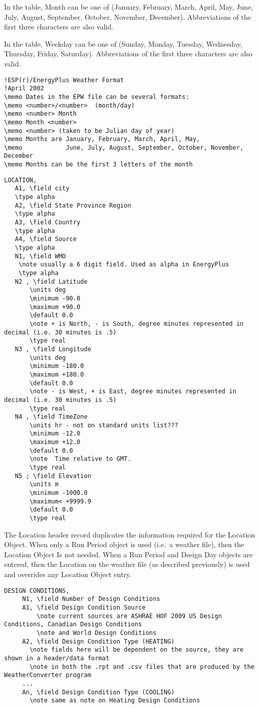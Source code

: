 In the table, Month can be one of (January, February, March, April, May, June, July, August, September, October, November, December). Abbreviations of the first three characters are also valid.

In the table, Weekday can be one of (Sunday, Monday, Tuesday, Wednesday, Thursday, Friday, Saturday). Abbreviations of the first three characters are also valid.

\begin{lstlisting}
!ESP(r)/EnergyPlus Weather Format
!April 2002
\memo Dates in the EPW file can be several formats:
\memo <number>/<number>  (month/day)
\memo <number> Month
\memo Month <number>
\memo <number> (taken to be Julian day of year)
\memo Months are January, February, March, April, May,
\memo            June, July, August, September, October, November, December
\memo Months can be the first 3 letters of the month
\end{lstlisting}

\begin{lstlisting}
LOCATION,
   A1, \field city
   \type alpha
   A2, \field State Province Region
   \type alpha
   A3, \field Country
   \type alpha
   A4, \field Source
   \type alpha
   N1, \field WMO
    \note usually a 6 digit field. Used as alpha in EnergyPlus
    \type alpha
   N2 , \field Latitude
       \units deg
       \minimum -90.0
       \maximum +90.0
       \default 0.0
       \note + is North, - is South, degree minutes represented in decimal (i.e. 30 minutes is .5)
       \type real
   N3 , \field Longitude
       \units deg
       \minimum -180.0
       \maximum +180.0
       \default 0.0
       \note - is West, + is East, degree minutes represented in decimal (i.e. 30 minutes is .5)
       \type real
   N4 , \field TimeZone
       \units hr - not on standard units list???
       \minimum -12.0
       \maximum +12.0
       \default 0.0
       \note  Time relative to GMT.
       \type real
   N5 ; \field Elevation
       \units m
       \minimum -1000.0
       \maximum< +9999.9
       \default 0.0
       \type real
\end{lstlisting}

The Location header record duplicates the information required for the Location Object. When only a Run Period object is used (i.e.~a weather file), then the Location Object Is not needed. When a Run Period and Design Day objects are entered, then the Location on the weather file (as described previously) is used and overrides any Location Object entry.

\begin{lstlisting}
DESIGN CONDITIONS,
     N1, \field Number of Design Conditions
     A1, \field Design Condition Source
         \note current sources are ASHRAE HOF 2009 US Design Conditions, Canadian Design Conditions
         \note and World Design Conditions
     A2, \field Design Condition Type (HEATING)
       \note fields here will be dependent on the source, they are shown in a header/data format 
       \note in both the .rpt and .csv files that are produced by the WeatherConverter program
     ...
     An, \field Design Condition Type (COOLING)
       \note same as note on Heating Design Conditions
\end{lstlisting}

